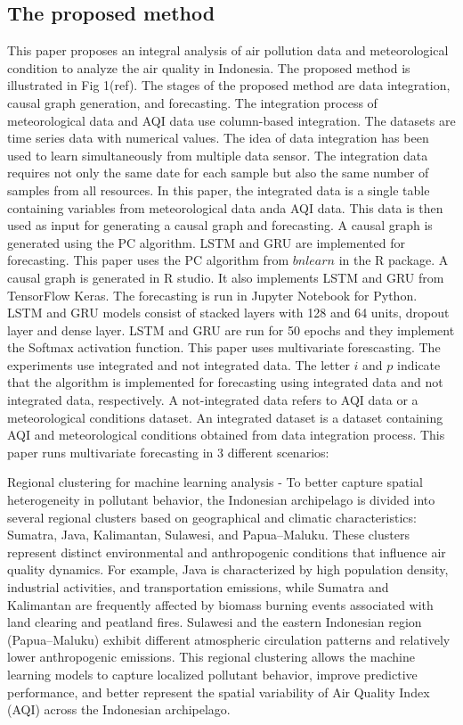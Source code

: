 \documentclass[pdflatex,sn-mathphys-num]{sn-jnl}%
\theoremstyle{thmstyleone}%
\theoremstyle{thmstyletwo}%
\theoremstyle{thmstylethree}%
\begin{document}
\subsection{The proposed method}
This paper proposes an integral analysis of air pollution data and meteorological condition to analyze the air quality in Indonesia. The proposed method is illustrated in Fig 1(ref). The stages of the proposed method are data integration, causal graph generation, and forecasting. The integration process of meteorological data and AQI data use column-based integration. The datasets are time series data with numerical values. The idea of data integration has been used to learn simultaneously from multiple data sensor. The integration data requires not only the same date for each sample but also the same number of samples from all resources. In this paper, the integrated data is a single table containing variables from meteorological data anda AQI data. This data is then used as input for generating a causal graph and forecasting. A causal graph is generated using the PC algorithm. LSTM and GRU are implemented for forecasting.
This paper uses the PC algorithm from $bnlearn$ in the R package. A causal graph is generated in R studio. It also implements LSTM and GRU from TensorFlow Keras. The forecasting is run in Jupyter Notebook for Python. LSTM and GRU models consist of stacked layers with 128 and 64 units, dropout layer and dense layer. LSTM and GRU are run for 50 epochs and they implement the Softmax activation function. This paper uses multivariate forescasting. The experiments use integrated and not integrated data. The letter $i$ and $p$ indicate that the algorithm is implemented for forecasting using integrated data and not integrated data, respectively. A not-integrated data refers to AQI data or a meteorological conditions dataset. An integrated dataset is a dataset containing AQI and meteorological conditions obtained from data integration process. This paper runs multivariate forecasting in 3 different scenarios:

Regional clustering for machine learning analysis - To better capture spatial heterogeneity in pollutant behavior, the Indonesian archipelago is divided into several regional clusters based on geographical and climatic characteristics: Sumatra, Java, Kalimantan, Sulawesi, and Papua–Maluku. These clusters represent distinct environmental and anthropogenic conditions that influence air quality dynamics. For example, Java is characterized by high population density, industrial activities, and transportation emissions, while Sumatra and Kalimantan are frequently affected by biomass burning events associated with land clearing and peatland fires. Sulawesi and the eastern Indonesian region (Papua–Maluku) exhibit different atmospheric circulation patterns and relatively lower anthropogenic emissions. This regional clustering allows the machine learning models to capture localized pollutant behavior, improve predictive performance, and better represent the spatial variability of Air Quality Index (AQI) across the Indonesian archipelago.
\end{document}
